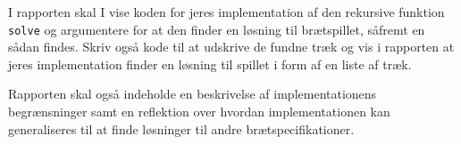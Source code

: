I rapporten skal I vise koden for jeres implementation af den
rekursive funktion \lstinline{solve} og argumentere for at den finder
en løsning til brætspillet, såfremt en sådan findes. Skriv også kode
til at udskrive de fundne træk og vis i rapporten at jeres
implementation finder en løsning til spillet i form af en liste af
træk.

Rapporten skal også indeholde en beskrivelse af implementationens
begrænsninger samt en reflektion over hvordan implementationen kan
generaliseres til at finde løsninger til andre brætspecifikationer.
